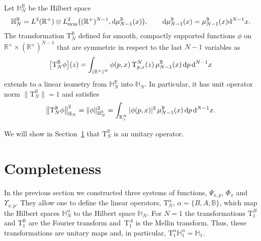 \begin{Theorem}
Let $\mathbb H_N^{\mathbb B}$ be the Hilbert space
\begin{gather*}
\mathbb H_N^{\mathbb B} =L^2(\mathbb R^+)\otimes
L^2_{\rm sym}\big( (\mathbb R^+)^{N-1}, {\rm d}\mu^{\mathbb B}_{N-1}(x)\big),\qquad
{\rm d}\mu^{\mathbb B}_{N-1}(x)=\mu^{\mathbb B}_{N-1}(x) {\rm d}^{N-1}x.
\end{gather*}
The transformation $\mathrm T_N^{\mathbb B}$ defined for smooth, compactly supported functions $\phi$ on $\mathbb{R}^+\times
(\mathbb{R}^+)^{N-1}$ that are symmetric in respect to the last $N-1$ variables as
\begin{gather*}%
\big[ \mathrm T_N^{\mathbb B} \phi\big](z)=\int_{ (\mathbb R^+)^{N}} \phi(p, x)\, \Upsilon^N_{p,{x}}( z)\, \mu_{N-1}^{\mathbb B}( x) \, {\rm d}p\, {\rm d}^{N-1} x
\end{gather*}
extends to a linear isometry from $\mathbb H_N^{\mathbb B}$ into $\mathbb H_N$. In particular, it has unit operator norm \mbox{$\big\|\mathrm T_{N}^{\mathbb B}\big\|=1$} and satisfies
\begin{gather*}
\big\| \mathrm T_N^{\mathbb B} \phi\big\|^2_{ \mathbb H_N } = \| \phi\|^2_{ \mathbb H_N^{\mathbb B} } =
\int_{\mathbb R_+^{N}} |\phi(p, x)|^2\, \mu_{N-1}^{\mathbb B}( x)\, {\rm d}p\,{\rm d}^{N-1} x.
\end{gather*}
\end{Theorem}

We will show in Section~\ref{Section Completude} that $\mathrm T_N^{\mathbb B}$ is an unitary operator.


\section{Completeness}
\label{Section Completude}

In the previous section we constructed three systems of functions, $\Psi_{x,p}$, $\Phi_x$ and $\Upsilon_{x,p}$. They allow one to define
the linear operators, $\mathrm T_N^\alpha$, $\alpha=\{B,A,{\mathbb B}\}$, which map the Hilbert spaces $\mathbb H_N^\alpha$ to the
Hilbert space $\mathbb H_N$. For $N=1$ the transformations $\mathrm T_{1}^B$ and $\mathrm T_{1}^{\mathbb B}$ are the Fourier transform and~$\mathrm T_{1}^{A}$ is the Mellin transform. Thus, these transformations are unitary maps and, in particular, $\mathrm T_{1}^\alpha \mathbb
H_{1}^\alpha=\mathbb H_{1}$.


